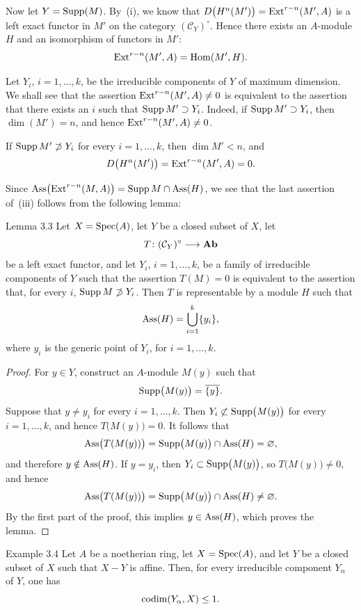 \medskip
Now let $Y=\operatorname{Supp}(M)$. By~\textup{(i)}, we know that
$D\bigl(H^n(M')\bigr)=\operatorname{Ext}^{r-n}(M',A)$ is a left exact functor in $M'$ on
the category $(\mathcal C_Y)^\circ$. Hence there exists an $A$-module $H$ and
an isomorphism of functors in $M'$:
\[
  \operatorname{Ext}^{r-n}(M',A)=\operatorname{Hom}(M',H).
\]

Let $Y_i$, $i=1,\ldots,k$, be the irreducible components of $Y$ of maximum
dimension. We shall see that the assertion
$\operatorname{Ext}^{r-n}(M',A)\neq 0$ is equivalent to the assertion that there exists an
$i$ such that $\operatorname{Supp} M'\supset Y_i$. Indeed, if
$\operatorname{Supp} M'\supset Y_i$, then $\dim(M')=n$, and hence
$\operatorname{Ext}^{r-n}(M',A)\neq 0$.

If $\operatorname{Supp} M'\not\supset Y_i$ for every $i=1,\ldots,k$, then
$\dim M'<n$, and
\[
  D\bigl(H^n(M')\bigr)=\operatorname{Ext}^{r-n}(M',A)=0.
\]

Since
$\operatorname{Ass}\bigl(\operatorname{Ext}^{r-n}(M,A)\bigr)=\operatorname{Supp} M\cap\operatorname{Ass}(H)$, we see that
the last assertion of~\textup{(iii)} follows from the following lemma:

\begin{sgalemma}{Lemma 3.3}
Let $X=\operatorname{Spec}(A)$, let $Y$ be a closed subset of $X$, let
\[
  T\colon(\mathcal C_Y)^\circ\longrightarrow\mathbf{Ab}
\]
be a left exact functor, and let $Y_i$, $i=1,\ldots,k$, be a family of
irreducible components of $Y$ such that the assertion $T(M)=0$ is equivalent
to the assertion that, for every $i$, $\operatorname{Supp} M\not\supset Y_i$. Then $T$ is
representable by a module $H$ such that
\[
  \operatorname{Ass}(H)=\bigcup_{i=1}^k\{y_i\},
\]
where $y_i$ is the generic point of $Y_i$, for $i=1,\ldots,k$.
\end{sgalemma}

\begin{proof}
For $y\in Y$, construct an $A$-module $M(y)$ such that
\[
  \operatorname{Supp}\bigl(M(y)\bigr)=\overline{\{y\}}.
\]
Suppose that $y\neq y_i$ for every $i=1,\ldots,k$. Then
$Y_i\not\subset\operatorname{Supp}\bigl(M(y)\bigr)$ for every $i=1,\ldots,k$, and hence
$T\bigl(M(y)\bigr)=0$. It follows that
\[
  \operatorname{Ass}\bigl(T(M(y))\bigr)
  =\operatorname{Supp}\bigl(M(y)\bigr)\cap\operatorname{Ass}(H)=\varnothing,
\]
and therefore $y\notin\operatorname{Ass}(H)$. If $y=y_i$, then
$Y_i\subset\operatorname{Supp}\bigl(M(y)\bigr)$, so $T\bigl(M(y)\bigr)\neq0$, and hence
\[
  \operatorname{Ass}\bigl(T(M(y))\bigr)
  =\operatorname{Supp}\bigl(M(y)\bigr)\cap\operatorname{Ass}(H)\neq\varnothing.
\]
By the first part of the proof, this implies $y\in\operatorname{Ass}(H)$, which proves
the lemma.\qedhere
\end{proof}

\begin{sgaexample}{Example 3.4}
Let $A$ be a noetherian ring, let $X=\operatorname{Spec}(A)$, and let $Y$ be a closed
subset of $X$ such that $X-Y$ is affine. Then, for every irreducible component
$Y_{\alpha}$ of $Y$, one has
\[
  \operatorname{codim}(Y_{\alpha},X)\leq 1.
\]
\end{sgaexample}

